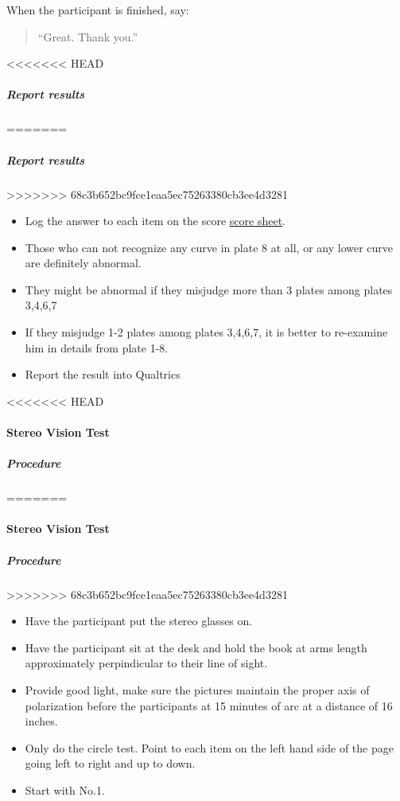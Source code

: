 \documentclass[]{article}
\providecommand{\tightlist}{%
  \setlength{\itemsep}{0pt}\setlength{\parskip}{0pt}}
\let\oldparagraph\paragraph
\renewcommand{\paragraph}[1]{\oldparagraph{#1}\mbox{}}
\let\oldsubparagraph\subparagraph
\renewcommand{\subparagraph}[1]{\oldsubparagraph{#1}\mbox{}}
\begin{document}
When the participant is finished, say:

\begin{quote}
``Great. Thank you.''
\end{quote}

<<<<<<< HEAD
\subparagraph{Report results}\label{report-results-1}
=======
\hypertarget{report-results-1}{%
\subparagraph{Report results}\label{report-results-1}}
>>>>>>> 68c3b652bc9fce1eaa5ec75263380cb3ee4d3281

\begin{itemize}
\tightlist
\item
  Log the answer to each item on the score
  \href{vision-screening-score-sheet.html}{score sheet}.
\item
  Those who can not recognize any curve in plate 8 at all, or any lower
  curve are definitely abnormal.
\item
  They might be abnormal if they misjudge more than 3 plates among
  plates 3,4,6,7
\item
  If they misjudge 1-2 plates among plates 3,4,6,7, it is better to
  re-examine him in details from plate 1-8.
\item
  Report the result into Qualtrics
\end{itemize}

<<<<<<< HEAD
\paragraph{Stereo Vision Test}\label{stereo-vision-test}

\subparagraph{Procedure}\label{procedure-2}
=======
\hypertarget{stereo-vision-test}{%
\paragraph{Stereo Vision Test}\label{stereo-vision-test}}

\hypertarget{procedure-2}{%
\subparagraph{Procedure}\label{procedure-2}}
>>>>>>> 68c3b652bc9fce1eaa5ec75263380cb3ee4d3281

\begin{itemize}
\tightlist
\item
  Have the participant put the stereo glasses on.
\item
  Have the participant sit at the desk and hold the book at arms length
  approximately perpindicular to their line of sight.
\item
  Provide good light, make sure the pictures maintain the proper axis of
  polarization before the participants at 15 minutes of arc at a
  distance of 16 inches.
\item
  Only do the circle test. Point to each item on the left hand side of
  the page going left to right and up to down.
\item
  Start with No.1.
\end{itemize}
\end{document}
